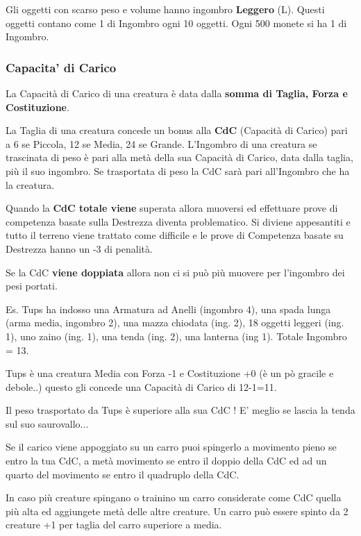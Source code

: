 \begin{multicols}{2}
Gli oggetti con scarso peso e volume hanno ingombro \textbf{Leggero} (L). Questi oggetti contano come 1 di Ingombro ogni 10 oggetti. Ogni 500 monete si ha 1 di Ingombro.

\subsubsection{Capacita' di Carico}\label{capacitadicarico}

La Capacità di Carico di una creatura è data dalla \textbf{somma di Taglia, Forza e Costituzione}.

La Taglia di una creatura concede un bonus alla \textbf{CdC} (Capacità di Carico) pari a 6 se Piccola, 12 se Media, 24 se Grande. L'Ingombro di una creatura se trascinata di peso è pari alla metà della sua Capacità di Carico, data dalla taglia, più il suo ingombro. Se trasportata di peso la CdC sarà pari all'Ingombro che ha la creatura.

Quando la \textbf{CdC totale viene} superata allora muoversi ed effettuare prove di competenza basate sulla Destrezza diventa problematico. Si diviene appesantiti e tutto il terreno viene trattato come difficile e le prove di Competenza basate su Destrezza hanno un -3 di penalità.

Se la CdC \textbf{viene doppiata} allora non ci si può più muovere per l'ingombro dei pesi portati.

Es. Tups ha indosso una Armatura ad Anelli (ingombro 4), una spada lunga (arma media, ingombro 2), una mazza chiodata (ing. 2), 18 oggetti leggeri (ing. 1), uno zaino (ing. 1), una tenda (ing. 2), una lanterna (ing 1). Totale Ingombro = 13.

Tups è una creatura Media con Forza -1 e Costituzione +0 (è un pò gracile e debole..) questo gli concede una Capacità di Carico di 12-1=11.

Il peso trasportato da Tups è superiore alla sua CdC ! E' meglio se lascia la tenda sul suo saurovallo...

Se il carico viene appoggiato su un carro puoi spingerlo a movimento pieno se entro la tua CdC, a metà movimento se entro il doppio della CdC ed ad un quarto del movimento se entro il quadruplo della CdC.

In caso più creature spingano o trainino un carro considerate come CdC quella più alta ed aggiungete metà delle altre creature. Un carro può essere spinto da 2 creature +1 per taglia del carro superiore a media.


\end{multicols}
